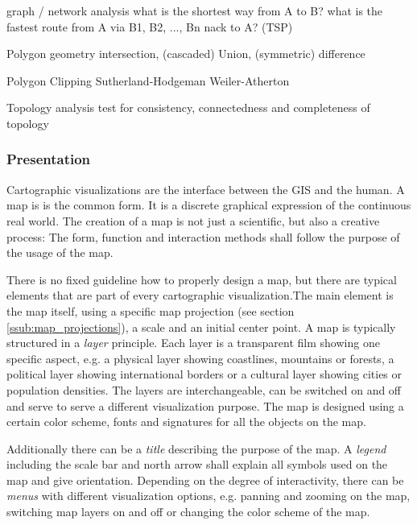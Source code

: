 graph / network analysis
  what is the shortest way from A to B?
  what is the fastest route from A via B1, B2, ..., Bn nack to A? (TSP)

Polygon geometry
  intersection, (cascaded) Union, (symmetric) difference

Polygon Clipping
  Sutherland-Hodgeman
  Weiler-Atherton

Topology analysis
  test for consistency, connectedness and completeness of topology



\subsubsection{Presentation} %
\label{ssub:presentation}

Cartographic visualizations are the interface between the GIS and the human. A map is is the common form. It is a discrete graphical expression of the continuous real world. The creation of a map is not just a scientific, but also a creative process: The form, function and interaction methods shall follow the purpose of the usage of the map.

There is no fixed guideline how to properly design a map, but there are typical elements that are part of every cartographic visualization.The main element is the map itself, using a specific map projection (see section \ref{ssub:map_projections}), a scale and an initial center point. A map is typically structured in a \emph{layer} principle. Each layer is a transparent film showing one specific aspect, e.g. a physical layer showing coastlines, mountains or forests, a political layer showing international borders or a cultural layer showing cities or population densities. The layers are interchangeable, can be switched on and off and serve to serve a different visualization purpose. The map is designed using a certain color scheme, fonts and signatures for all the objects on the map.

Additionally there can be a \emph{title} describing the purpose of the map. A \emph{legend} including the scale bar and north arrow shall explain all symbols used on the map and give orientation. Depending on the degree of interactivity, there can be \emph{menus} with different visualization options, e.g. panning and zooming on the map, switching map layers on and off or changing the color scheme of the map.
\cite[pp. 159-166]{bolstad2008gis}


